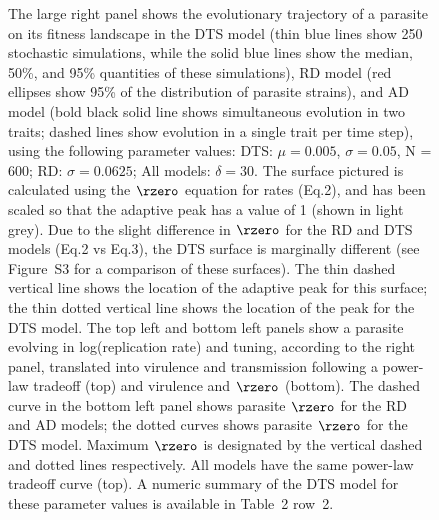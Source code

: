 \begin{figure}[H]
\caption{The large right panel shows the evolutionary trajectory of a parasite on its fitness landscape in the DTS model (thin blue lines show 250 stochastic simulations, while the solid blue lines show the median, 50\%, and 95\% quantities of these simulations), RD model (red ellipses show 95\% of the distribution of parasite strains), and AD model (bold black solid line shows simultaneous evolution in two traits; dashed lines show evolution in a single trait per time step), using the following parameter values: DTS: $\mu = 0.005$, $\sigma = 0.05$, N = 600; RD: $\sigma = 0.0625$; All models: $\delta = 30$. The surface pictured is calculated using the $\rzero$ equation for rates (Eq.2), and has been scaled so that the adaptive peak has a value of 1 (shown in light grey). Due to the slight difference in $\rzero$ for the RD and DTS models (Eq.2 vs Eq.3), the DTS surface is marginally different (see Figure~S3 for a comparison of these surfaces). The thin dashed vertical line shows the location of the adaptive peak for this surface; the thin dotted vertical line shows the location of the peak for the DTS model. 
\break
The top left and bottom left panels show a parasite evolving in log(replication rate) and tuning, according to the right panel, translated into virulence and transmission following a power-law tradeoff (top) and virulence and $\rzero$ (bottom). The dashed curve in the bottom left panel shows parasite $\rzero$ for the RD and AD models; the dotted curves shows parasite $\rzero$ for the DTS model. Maximum $\rzero$ is designated by the vertical dashed and dotted lines respectively. All models have the same power-law tradeoff curve (top). A numeric summary of the DTS model for these parameter values is available in Table~2 row~2.} 
\label{fig:landscape1}
\end{figure} 
\clearpage

